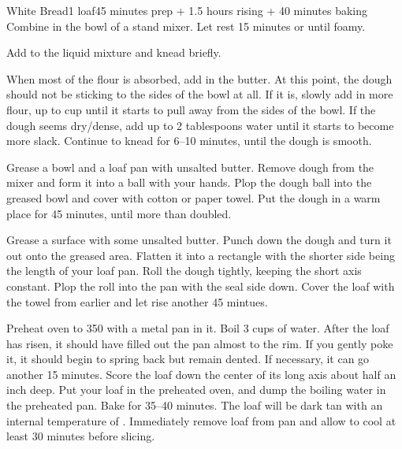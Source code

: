 \documentclass[../Cookbook.tex]{subfiles}
\begin{document}
\begin{recipe}[WhiteBread]{White Bread}{1 loaf}{45 minutes prep + 1.5 hours rising + 40 minutes baking}
Combine in the bowl of a stand mixer. Let rest 15 minutes or until foamy.

Add to the liquid mixture and knead briefly.

When most of the flour is absorbed, add in the butter.
At this point, the dough should not be sticking to the sides of the bowl at all.
If it is, slowly add in more flour, up to  cup until it starts to pull away from the sides of the bowl.
If the dough seems dry/dense, add up to 2 tablespoons water until it starts to become more slack.
Continue to knead for 6--10 minutes, until the dough is smooth.

Grease a bowl and a loaf pan with unsalted butter.
Remove dough from the mixer and form it into a ball with your hands.
Plop the dough ball into the greased bowl and cover with cotton or paper towel.
Put the dough in a warm place for 45 minutes, until more than doubled.

Grease a surface with some unsalted butter.
Punch down the dough and turn it out onto the greased area.
Flatten it into a rectangle with the shorter side being the length of your loaf pan.
Roll the dough tightly, keeping the short axis constant.
Plop the roll into the pan with the seal side down.
Cover the loaf with the towel from earlier and let rise another 45 mintues.

Preheat oven to 350 with a metal pan in it.
Boil 3 cups of water.
After the loaf has risen, it should have filled out the pan almost to the rim.
If you gently poke it, it should begin to spring back but remain dented.
If necessary, it can go another 15 minutes.
Score the loaf down the center of its long axis about half an inch deep.
Put your loaf in the preheated oven, and dump the boiling water in the preheated pan.
Bake for 35--40 minutes.
The loaf will be dark tan with an internal temperature of .
Immediately remove loaf from pan and allow to cool at least 30 minutes before slicing.

\end{recipe}
\end{document}
